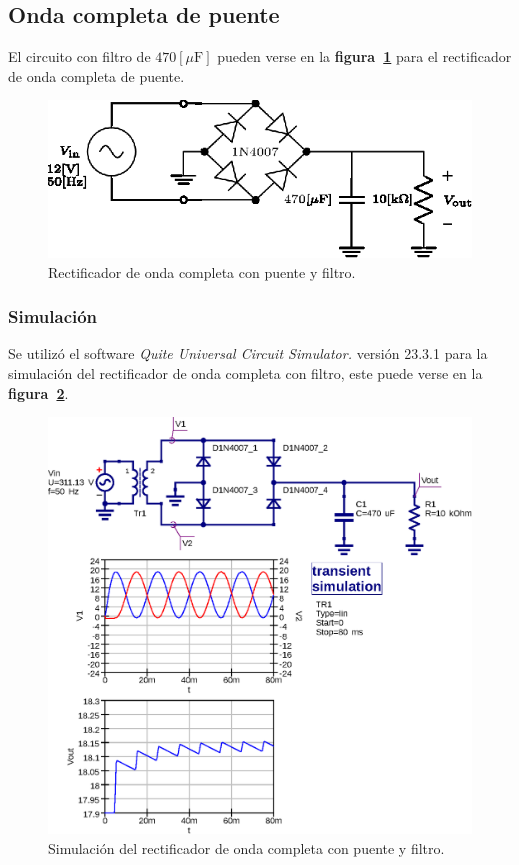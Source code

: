 \subsection{Onda completa de puente}
El circuito con filtro de $470[\mu\text{F}]$ pueden verse en la
\textbf{figura~\ref{circuito07}} para el rectificador de onda completa de
puente.

\begin{figure}[!h]
\centering
\includegraphics[scale=1]{diagramas/07.onda_completa2.eps}
\caption{Rectificador de onda completa con puente y filtro.}
\label{circuito07}
\end{figure}

\subsubsection{Simulación}
Se utilizó el software \emph{Quite Universal Circuit Simulator.} versión 23.3.1
para la simulación del rectificador de onda completa con filtro, este puede
verse en la \textbf{figura~\ref{simulacion07}}.

\begin{figure}[!h]
\centering
\includegraphics[scale=0.75]{simulacion/07.onda_completa2.eps}
\caption{Simulación del rectificador de onda completa con puente y filtro.}
\label{simulacion07}
\end{figure}

